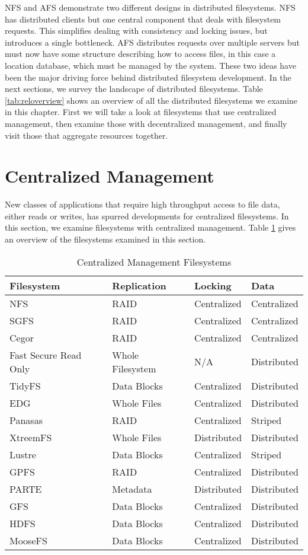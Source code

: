 NFS and AFS demonstrate two different designs in distributed filesystems. NFS has distributed clients but one central component that deals with filesystem requests. This simplifies dealing with consistency and locking issues, but introduces a single bottleneck. AFS distributes requests over multiple servers but must now have some structure describing how to access files, in this case a location database, which must be managed by the system. These two ideas have been the major driving force behind distributed filesystem development. In the next sections, we survey the landscape of distributed filesystems. Table \ref{tab:reloverview} shows an overview of all the distributed filesystems we examine in this chapter. First we will take a look at filesystems that use centralized management, then examine those with decentralized management, and finally visit those that aggregate resources together.


\section{Centralized Management}

New classes of applications that require high throughput access to file data, either reads or writes, has spurred developments for centralized filesystems. In this section, we examine filesystems with centralized management. Table \ref{tab:centralized} gives an overview of the filesystems examined in this section.

\begin{table}
\centering
\begin{tabular}[h]{l|l|l|l}

\textbf{Filesystem} & \textbf{Replication} & \textbf{Locking} & \textbf{Data} \\
\hline
NFS & RAID & Centralized & Centralized \\
SGFS & RAID & Centralized & Centralized \\
Cegor & RAID & Centralized & Centralized \\
Fast Secure Read Only & Whole Filesystem & N/A & Distributed \\
TidyFS & Data Blocks & Centralized & Distributed \\
EDG & Whole Files & Centralized & Distributed \\
Panasas & RAID & Centralized & Striped \\
XtreemFS & Whole Files & Distributed & Distributed \\
Lustre & Data Blocks & Centralized & Striped \\
GPFS & RAID & Centralized & Distributed \\
PARTE & Metadata & Distributed & Distributed \\
GFS & Data Blocks & Centralized & Distributed \\
HDFS & Data Blocks & Centralized & Distributed \\
MooseFS & Data Blocks & Centralized & Distributed \\

\end{tabular}
\caption{Centralized Management Filesystems}
\label{tab:centralized}
\end{table}


